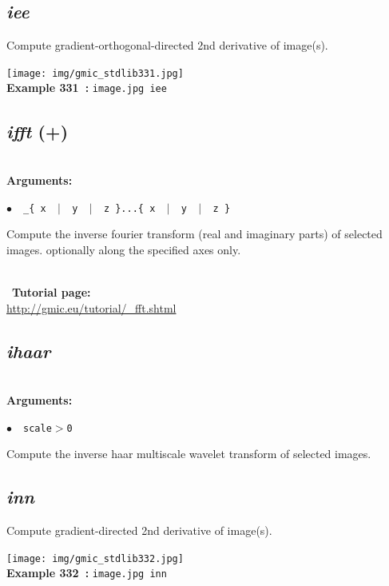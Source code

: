 \documentclass[a4paper,10.5pt,twoside]{book}
\newcommand{\Cb}[1]{\textcolor{cb}{#1}}
\begin{document}
\subsection{\emph{iee} }\vspace*{-0.7em}
Compute gradient-orthogonal-directed 2nd derivative of image(s).
\begin{center}\texttt{[image: img/gmic\_stdlib331.jpg]}\\
{\footnotesize \textbf{Example 331~:} \texttt{image.jpg iee}}
\end{center}

\subsection{\emph{ifft} (+)}\vspace*{-0.7em}
~\\\textbf{\Cb{Arguments: }}\begin{flushleft}
{\small \Cb{\hspace*{0.5cm}$\bullet$~~\texttt{\_\{ x ~$|$~ y ~$|$~ z \}...\{ x ~$|$~ y ~$|$~ z \}}}}\end{flushleft}
Compute the inverse fourier transform (real and imaginary parts) of selected images.
optionally along the specified axes only.

~\\
~\textbf{Tutorial page: }\\\url{http://gmic.eu/tutorial/\_fft.shtml}


\subsection{\emph{ihaar} }\vspace*{-0.7em}
~\\\textbf{\Cb{Arguments: }}\begin{flushleft}
{\small \Cb{\hspace*{0.5cm}$\bullet$~~\texttt{scale$>$0}}}\end{flushleft}
Compute the inverse haar multiscale wavelet transform of selected images.


\subsection{\emph{inn} }\vspace*{-0.7em}
Compute gradient-directed 2nd derivative of image(s).
\begin{center}\texttt{[image: img/gmic\_stdlib332.jpg]}\\
{\footnotesize \textbf{Example 332~:} \texttt{image.jpg inn}}
\end{center}
\end{document}
